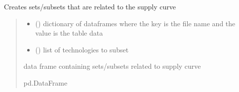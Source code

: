 \documentclass[letterpaper,10pt,english]{sphinxmanual}
\begin{document}
\begin{fulllineitems}
\label{\detokenize{src.models.electricity.scripts.preprocessor:src.models.electricity.scripts.preprocessor.hourly_sc_subset}}
\pysigstartsignatures
\pysiglinewithargsret
{}
{\sphinxparamcomma {}}
{}
\pysigstopsignatures
\sphinxAtStartPar
Creates sets/subsets that are related to the supply curve
\begin{quote}\begin{description}
\begin{itemize}
\item {} 
\sphinxAtStartPar
{} () \textendash{} dictionary of dataframes where the key is the file name and the value is the table data

\item {} 
\sphinxAtStartPar
{} () \textendash{} list of technologies to subset

\end{itemize}

\sphinxAtStartPar
data frame containing sets/subsets related to supply curve

\sphinxAtStartPar
pd.DataFrame

\end{description}\end{quote}

\end{fulllineitems}

\end{document}
